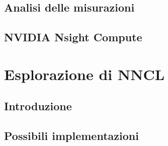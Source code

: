 \documentclass[a4paper]{article}
\begin{document}
\subsection{Analisi delle misurazioni}

\subsection{NVIDIA Nsight Compute}

\section{Esplorazione di NNCL}

\subsection{Introduzione}

\subsection{Possibili implementazioni}

\printbibliography
\end{document}
